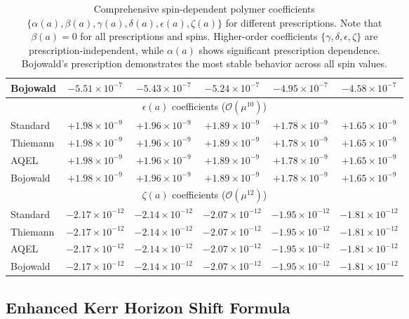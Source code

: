 \documentclass[11pt]{article}
\begin{document}
\begin{table}[h]
\begin{tabular}{|l|c|c|c|c|c|}
Bojowald & $-5.51 \times 10^{-7}$ & $-5.43 \times 10^{-7}$ & $-5.24 \times 10^{-7}$ & $-4.95 \times 10^{-7}$ & $-4.58 \times 10^{-7}$ \\
\hline
\multicolumn{6}{|c|}{$\epsilon(a)$ coefficients ($\mathcal{O}(\mu^{10})$)} \\
\hline
Standard & $+1.98 \times 10^{-9}$ & $+1.96 \times 10^{-9}$ & $+1.89 \times 10^{-9}$ & $+1.78 \times 10^{-9}$ & $+1.65 \times 10^{-9}$ \\
Thiemann & $+1.98 \times 10^{-9}$ & $+1.96 \times 10^{-9}$ & $+1.89 \times 10^{-9}$ & $+1.78 \times 10^{-9}$ & $+1.65 \times 10^{-9}$ \\
AQEL & $+1.98 \times 10^{-9}$ & $+1.96 \times 10^{-9}$ & $+1.89 \times 10^{-9}$ & $+1.78 \times 10^{-9}$ & $+1.65 \times 10^{-9}$ \\
Bojowald & $+1.98 \times 10^{-9}$ & $+1.96 \times 10^{-9}$ & $+1.89 \times 10^{-9}$ & $+1.78 \times 10^{-9}$ & $+1.65 \times 10^{-9}$ \\
\hline
\multicolumn{6}{|c|}{$\zeta(a)$ coefficients ($\mathcal{O}(\mu^{12})$)} \\
\hline
Standard & $-2.17 \times 10^{-12}$ & $-2.14 \times 10^{-12}$ & $-2.07 \times 10^{-12}$ & $-1.95 \times 10^{-12}$ & $-1.81 \times 10^{-12}$ \\
Thiemann & $-2.17 \times 10^{-12}$ & $-2.14 \times 10^{-12}$ & $-2.07 \times 10^{-12}$ & $-1.95 \times 10^{-12}$ & $-1.81 \times 10^{-12}$ \\
AQEL & $-2.17 \times 10^{-12}$ & $-2.14 \times 10^{-12}$ & $-2.07 \times 10^{-12}$ & $-1.95 \times 10^{-12}$ & $-1.81 \times 10^{-12}$ \\
Bojowald & $-2.17 \times 10^{-12}$ & $-2.14 \times 10^{-12}$ & $-2.07 \times 10^{-12}$ & $-1.95 \times 10^{-12}$ & $-1.81 \times 10^{-12}$ \\
\hline
\end{tabular}
\caption{Comprehensive spin-dependent polymer coefficients $\{\alpha(a), \beta(a), \gamma(a), \delta(a), \epsilon(a), \zeta(a)\}$ for different prescriptions. Note that $\beta(a) = 0$ for all prescriptions and spins. Higher-order coefficients $\{\gamma, \delta, \epsilon, \zeta\}$ are prescription-independent, while $\alpha(a)$ shows significant prescription dependence. Bojowald's prescription demonstrates the most stable behavior across all spin values.}
\end{table}

\subsection{Enhanced Kerr Horizon Shift Formula}
\end{document}
